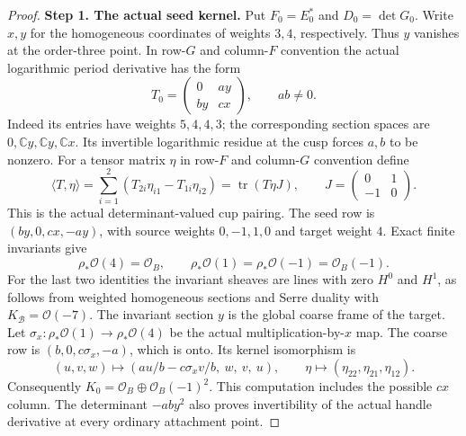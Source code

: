 \begin{proof}
\noindent\textbf{Step 1. The actual seed kernel.}
Put $F_0=E_0^*$ and $D_0=\det G_0$. Write $x,y$ for the homogeneous
coordinates of weights $3,4$, respectively. Thus $y$ vanishes at the
order-three point. In row-$G$ and column-$F$ convention the actual
logarithmic period derivative has the form
\[
 T_0=\begin{pmatrix}0&ay\\by&cx\end{pmatrix},\qquad ab\ne0.
\]
Indeed its entries have weights $5,4,4,3$; the corresponding section
spaces are $0,\mathbb Cy,\mathbb Cy,\mathbb Cx$. Its invertible
logarithmic residue at the cusp forces $a,b$ to be nonzero.
For a tensor matrix $\eta$ in row-$F$ and column-$G$ convention define
\[
 \langle T,\eta\rangle
   =\sum_{i=1}^2(T_{2i}\eta_{i1}-T_{1i}\eta_{i2})
   =\operatorname{tr}(T\eta J),\qquad
 J=\begin{pmatrix}0&1\\-1&0\end{pmatrix}.
\]
This is the actual determinant-valued cup pairing. The seed row is
$(by,0,cx,-ay)$, with source weights $0,-1,1,0$ and target weight $4$.
Exact finite invariants give
\[
 \rho_*\mathcal O(4)=\mathcal O_B,
 \qquad \rho_*\mathcal O(1)=\rho_*\mathcal O(-1)=\mathcal O_B(-1).
\]
For the last two identities the invariant sheaves are lines with zero
$H^0$ and $H^1$, as follows from weighted homogeneous sections and
Serre duality with $K_{\mathcal B}=\mathcal O(-7)$.
The invariant section $y$ is the global coarse frame of the target.
Let $\sigma_x:\rho_*\mathcal O(1)\to\rho_*\mathcal O(4)$ be the
actual multiplication-by-$x$ map. The coarse row is
$(b,0,c\sigma_x,-a)$, which is onto. Its kernel isomorphism is
\[
 (u,v,w)\longmapsto
 (au/b-c\sigma_xv/b,\ w,\ v,\ u),
 \qquad \eta\longmapsto(\eta_{22},\eta_{21},\eta_{12}).
\]
Consequently $K_0=\mathcal O_B\oplus\mathcal O_B(-1)^2$.
This computation includes the possible $cx$ column. The determinant
$-ab y^2$ also proves invertibility of the actual handle derivative at
every ordinary attachment point.


\end{proof}
